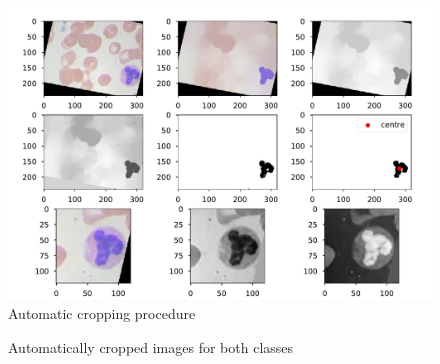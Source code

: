 \documentclass[10pt,a4paper]{article}
\begin{document}
\begin{figure}[!tbp]
  \centering
  \includegraphics[width=1\textwidth]{Graphs/Find_center.pdf}
  \caption{Automatic cropping procedure}\label{find_centre}
\end{figure}


\begin{figure}[!tbp]
  \centering
  \hfill
  \caption{Automatically cropped images for both classes}\label{cropped}
\end{figure}





\printbibliography
\end{document}
